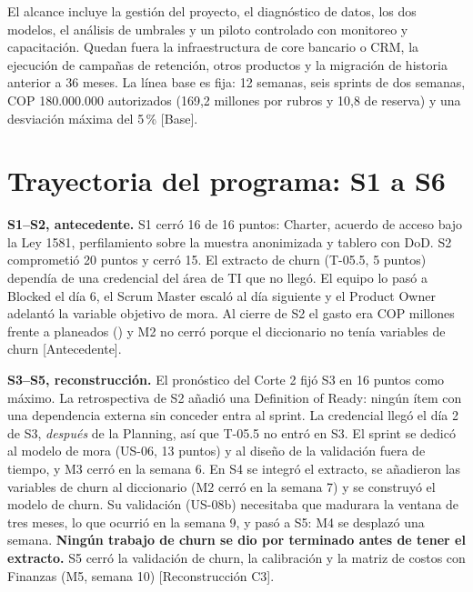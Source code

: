 \documentclass[10pt,a4paper]{article}
\newcommand{\rot}[1]{\textsf{\scriptsize\color{gris}[#1]}}
\begin{document}
El alcance incluye la gestión del proyecto, el diagnóstico de datos, los dos modelos, el análisis de umbrales y un piloto controlado con monitoreo y capacitación. Quedan fuera la infraestructura de core bancario o CRM, la ejecución de campañas de retención, otros productos y la migración de historia anterior a 36 meses. La línea base es fija: 12 semanas, seis sprints de dos semanas, COP 180.000.000 autorizados (169,2 millones por rubros y 10,8 de reserva) y una desviación máxima del 5\,\% \rot{Base}.

\begin{table}[h]
\caption{Trazabilidad de los objetivos del Charter al cierre}\label{tab:obj}

\end{table}

\section{Trayectoria del programa: S1 a S6}

\begin{table}[h]
\caption{Cierre de los seis sprints (compromiso y puntos que cumplen la DoD)}\label{tab:sprints}

\end{table}

\textbf{S1--S2, antecedente.} S1 cerró 16 de 16 puntos: Charter, acuerdo de acceso bajo la Ley 1581, perfilamiento sobre la muestra anonimizada y tablero con DoD. S2 comprometió 20 puntos y cerró 15. El extracto de churn (T-05.5, 5 puntos) dependía de una credencial del área de TI que no llegó. El equipo lo pasó a Blocked el día 6, el Scrum Master escaló al día siguiente y el Product Owner adelantó la variable objetivo de mora. Al cierre de S2 el gasto era COP \GastoSdos{} millones frente a \BaseSdos{} planeados (\DesvSdos) y M2 no cerró porque el diccionario no tenía variables de churn \rot{Antecedente}.

\textbf{S3--S5, reconstrucción.} El pronóstico del Corte 2 fijó S3 en 16 puntos como máximo. La retrospectiva de S2 añadió una Definition of Ready: ningún ítem con una dependencia externa sin conceder entra al sprint. La credencial llegó el día 2 de S3, \emph{después} de la Planning, así que T-05.5 no entró en S3. El sprint se dedicó al modelo de mora (US-06, 13 puntos) y al diseño de la validación fuera de tiempo, y M3 cerró en la semana 6. En S4 se integró el extracto, se añadieron las variables de churn al diccionario (M2 cerró en la semana 7) y se construyó el modelo de churn. Su validación (US-08b) necesitaba que madurara la ventana de tres meses, lo que ocurrió en la semana 9, y pasó a S5: M4 se desplazó una semana. \textbf{Ningún trabajo de churn se dio por terminado antes de tener el extracto.} S5 cerró la validación de churn, la calibración y la matriz de costos con Finanzas (M5, semana 10) \rot{Reconstrucción C3}.
\end{document}
